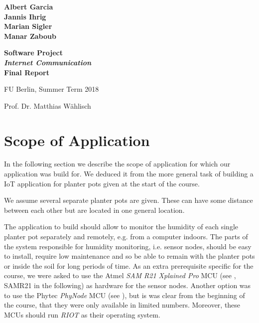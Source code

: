 \documentclass[11pt,paper=a4,parskip=half]{scrartcl}
\begin{document}
\thispagestyle{empty}


\begin{center}

\begin{spacing}{1.2}
\textbf{ \LARGE
Albert Garcia \\
Jannis Ihrig \\
Marian Sigler \\
Manar Zaboub \\
}

\end{spacing}\vspace{1.5em}


\textbf{ \Huge Software Project \\ \emph{Internet Communication} \\\vspace{0.8em}
Final Report}
\vspace{2.5em}

\begin{spacing}{1}
\Large

FU Berlin, Summer Term 2018

Prof. Dr. Matthias Wählisch
\end{spacing}
\end{center}

\vspace{10mm}


\setcounter{tocdepth}{2}
\tableofcontents

\newpage






\section{Scope of Application}
\label{sec:usecase}

  In the following section we describe the scope of application for which our
  application was build for. We deduced it from the more general task of
  building a IoT application for planter pots given at the start of the course.

  We assume several separate planter pots are given. These can have some
  distance between each other but are located in one general location.

  The application to build should allow to monitor the humidity of each single
  planter pot separately and remotely, e.g. from a computer indoors. The parts
  of the system responsible for humidity monitoring, i.e. sensor nodes, should
  be easy to install, require low maintenance and so be able to remain with the
  planter pots or inside the soil for long periods of time. As an extra
  prerequisite specific for the course, we were asked to use the Atmel
  \textit{SAM R21 Xplained Pro} MCU (see \cite{samr21}, SAMR21 in the
  following) as hardware for the sensor nodes. Another option was to use the
  Phytec \textit{PhyNode} MCU (see \cite{phywave}), but is was clear from the
  beginning of the course, that they were only available in limited numbers.
  Moreover, these MCUs should run \textit{RIOT} as their operating system.
\end{document}
